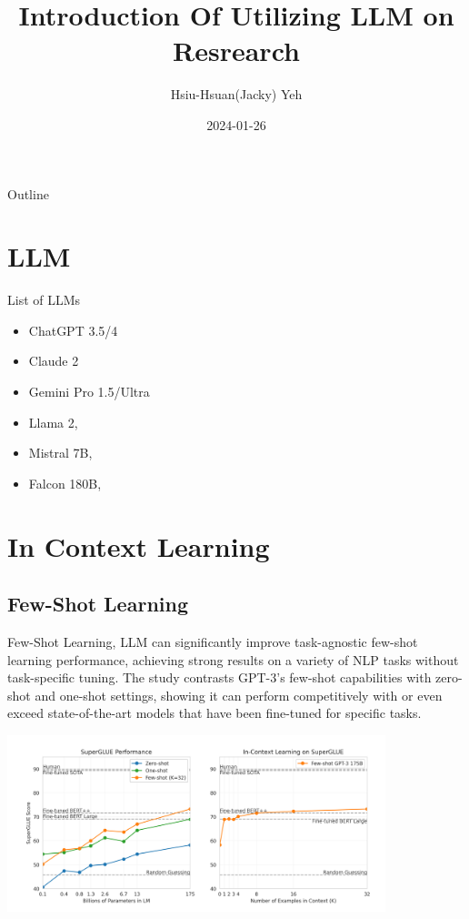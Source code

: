 \documentclass[11.5pt]{beamer}
\title{\huge{Introduction Of Utilizing LLM on Resrearch}}
\author{Hsiu-Hsuan(Jacky) Yeh}
\date{2024-01-26}
\begin{document}
\maketitle


\begin{frame}{Outline}
\tableofcontents
\end{frame}

\section{LLM}
\begin{frame}{List of LLMs}
\begin{itemize}
    \item ChatGPT 3.5/4
    \item Claude 2
    \item Gemini Pro 1.5/Ultra
    \item Llama 2, \cite{Touvron2023}
    \item Mistral 7B, \cite{Jiang2023} 
    \item Falcon 180B, \cite{Almazrouei2023}
\end{itemize}
\end{frame}

\section{In Context Learning}
\subsection{Few-Shot Learning}
\begin{frame}{Few-Shot Learning, \cite{Brown2020}}
LLM can significantly improve task-agnostic few-shot learning performance,
achieving strong results on a variety of NLP tasks without task-specific tuning.
The study contrasts GPT-3's few-shot capabilities with zero-shot and one-shot
settings, showing it can perform competitively with or even exceed
state-of-the-art models that have been fine-tuned for specific tasks.
\end{frame}


\begin{frame}
\includegraphics[width=11cm]{Figures/fig1.png}
\end{frame}
\end{document}
